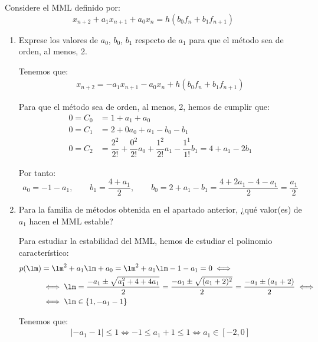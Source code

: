 \begin{ejercicio}
    Considere el MML definido por:
    \begin{equation*}
        x_{n+2} + a_1 x_{n+1} + a_0 x_n = h (b_0 f_n + b_1 f_{n+1})
    \end{equation*}
    \begin{enumerate}
        \item Exprese los valores de $a_0$, $b_0$, $b_1$ respecto de $a_1$ para que el método sea de orden, al menos, 2.
        
        Tenemos que:
        \begin{align*}
            x_{n+2} = - a_1 x_{n+1} - a_0 x_n + h (b_0 f_n + b_1 f_{n+1})
        \end{align*}

        Para que el método sea de orden, al menos, 2, hemos de cumplir que:
        \begin{align*}
            0 = C_0 &= 1+a_1+a_0 \\
            0 = C_1 &= 2 + 0a_0 + a_1 - b_0 - b_1 \\
            0 = C_2 &= \dfrac{2^2}{2!} + \dfrac{0^2}{2!}a_0 + \dfrac{1^2}{2!} a_1 - \dfrac{1^1}{1!} b_1
            = 4 + a_1 - 2b_1
        \end{align*}

        Por tanto:
        \begin{equation*}
            a_0 = -1 - a_1,\qquad b_1 = \dfrac{4 + a_1}{2},\qquad b_0 = 2+a_1-b_1 = \dfrac{4 +2a_1-4-a_1}{2} = \dfrac{a_1}{2}
        \end{equation*}
        \item Para la familia de métodos obtenida en el apartado anterior, ¿qué valor(es) de $a_1$ hacen el MML estable?
        
        Para estudiar la estabilidad del MML, hemos de estudiar el polinomio característico:
        \begin{align*}
            p(\lm) &= \lm^2 + a_1 \lm + a_0
            = \lm^2 + a_1 \lm - 1 - a_1
            = 0\iff\\&\iff
            \lm = \dfrac{-a_1 \pm \sqrt{a_1^2 +4+4a_1}}{2}
            = \dfrac{-a_1 \pm \sqrt{(a_1+2)^2}}{2}
            = \dfrac{-a_1 \pm (a_1+2)}{2}
            \iff\\&\iff
            \lm \in \{1,-a_1-1\}
        \end{align*}

        Tenemos que:
        \begin{align*}
            |-a_1-1|\leq 1\iff -1 \leq a_1+1\leq 1
            \iff a_1\in [-2,0]
        \end{align*}


\end{enumerate}
\end{ejercicio}
